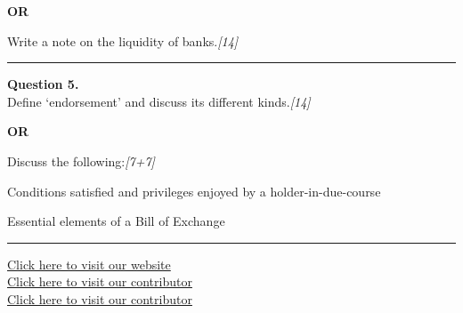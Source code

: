 \documentclass[11pt,a4paper]{article}
\newcommand{\pts}[1]{\hfill   \textit{[#1]}}
\begin{document}
\centerline{   \textbf{OR}}

Write a note on the liquidity of banks.\pts{14}

\medskip\rule{\linewidth}{0.2pt}




\noindent   \textbf{Question 5.} \\
Define `endorsement' and discuss its different kinds.\pts{14}

\centerline{   \textbf{OR}}

Discuss the following:\pts{7+7}

\begin{parts}
  \item Conditions satisfied and privileges enjoyed by a holder-in-due-course
  \item Essential elements of a Bill of Exchange
\end{parts}

\vfill
\rule{\linewidth}{0.4pt}

\begin{center}\small
\href{https://bhu-exam.vercel.app/}{Click here to visit our website}\\[4pt]
\href{https://me-aryan.vercel.app/}{Click here to visit our contributor}\\[4pt]
\href{https://quashan-me.vercel.app/}{Click here to visit our contributor}
\end{center}
\end{document}
